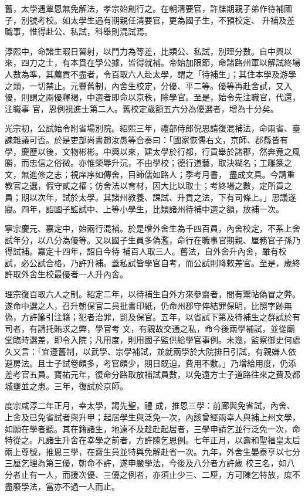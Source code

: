 \begin{pinyinscope}
 舊，太學遇覃恩無免解法，孝宗始創行之。在朝清要官，許牒期親子弟作待補國子，別號考校。如太學生遇有期親任清要官，更為國子生，不預校定、
 升補及差職事，惟得赴公、私試，科舉則混試焉。



 淳熙中，命諸生暇日習射，以鬥力為等差，比類公、私試，別理分數。自中興以來，四力之士，有本貫在學公據，皆得就補。帝始加限節，命諸路州軍以解試終場人數為準，其薦貢不盡者，令百取六人赴太學，謂之「待補生」；其住本學及游學之類，一切禁止。元豐舊制，內舍生校定，分優、平二等。優等再赴舍試，又入優，則謂之兩優釋褐，中選者即命以京秩，除學官。至是，始令先注職官，代還，注職事
 官，恩例視進士第二人。舊校定歲額五六分為優選者，增為十分矣。



 光宗初，公試始令附省場別院。紹熙三年，禮部侍郎倪思請復混補法，命兩省、臺諫雜議可否。於是吏部尚書趙汝愚等合奏曰：「國家恢儒右文，京師、郡縣皆有學，慶歷以後，文物彬彬。中興以來，建太學於行都，行貢舉於諸郡，然奔竟之風勝，而忠信之俗微。亦惟榮辱升沉，不由學校；德行道藝，取決糊名；工雕篆之文，無進修之志；視庠序如傳舍，目師儒如路人；季考月書，
 盡成文具。今請重教官之選，假守貳之權；仿舍法以育材，因大比以取士；考終場之數，定所貢之員；期以次年，試於太學。其諸州教養、課試、升貢之法，下有司條上。」思議遂寢。四年，詔國子監試中、上等小學生，比類諸州待補中選之額，放補一次。



 寧宗慶元、嘉定中，始兩行混補。於是增外舍生為千四百員，內舍校定，不系上舍試年分，以八分為優等。又以國子生員多偽濫，命行在職事官期親、厘務官子孫乃得試補。嘉定十四年，詔自今待
 補百人取三人。舊法，自外舍升內舍，雖有校試，必公試合格，乃許升補。蓋私試皆學官自考，而公試則降敕差官。至是，歲終許取外舍生校最優者一人升內舍。



 理宗復百取六人之制。紹定二年，以待補生自外方來參齋者，間有鬻帖偽冒之弊。遂命中選之人，召升朝保官二員批書印紙，仍命州郡守倅結罪保明，比照字跡無偽，方許簾引注籍；犯者治罪，罰及保官。五年，以省試下第及待補生之群試於有司者，有請托賄求之弊，學官考
 文，有親故交通之私，命今後兩學補試，並從廟堂臨時選差，即令入院；凡用度，則用國子監供給學官事例。未幾，監察御史何處久又言：「宜遵舊制，以武學、宗學補試，並就兩學於大院排日引試，有親嫌人依避房法。且士子試卷頗多，考官頗少，期日既迫，費用不敷。」乃增給用度，仍添差考官五員。寶祐元年，復命分路取放補試員數，以免遠方士子道路往來之費及都城壅並之患。三年，復試於京師。



 度宗咸淳二年正月，幸太學，謁先聖，禮
 成，推恩三學：前廊與免省試，內舍、上舍及已免省試者與升甲；起居學生與泛免一次，內該曾經兩幸人與補上州文學，如願在學者聽。其在籍諸生，地遠不及趁赴起居者，三學申請乞並行泛免一次，命特從之。凡諸生升舍在幸學之前者，方許陳乞恩例。七年正月，以壽和聖福皇太后兩上尊號，推恩三學，在齋生員並特與免解赴省一次。九年，外舍生晏泰亨以七分三厘乞理為第三優，朝命不許，遂申嚴學法，今後及八分者方許歲
 校三名，如八分者止有一人，而援次優、三優之例者，亦須止少三、二厘，方可陳乞特放，庶不盡廢學法，當亦不過一人而止。




\end{pinyinscope}
